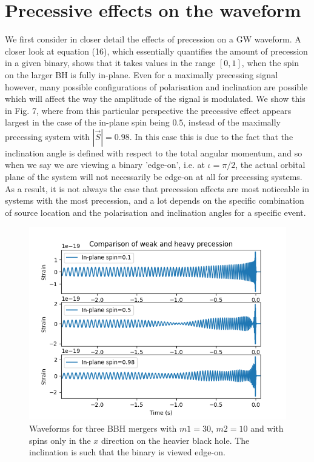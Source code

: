 \documentclass[]{article}
\begin{document}
\section{Precessive effects on the waveform}
We first consider in closer detail the effects of precession on a GW waveform. A closer look at equation (16), which essentially quantifies the amount of precession in a given binary, shows that it takes values in the range $[0,1]$, when the spin on the larger BH is fully in-plane. Even for a maximally precessing signal however, many possible configurations of polarisation and inclination are possible which will affect the way the amplitude of the signal is modulated. We show this in Fig. 7, where from this particular perspective the precessive effect appears largest in the case of the in-plane spin being $0.5$, instead of the maximally precessing system with $|\vec{S}|=0.98$. In this case this is due to the fact that the inclination angle is defined with respect to the total angular momentum, and so when we say we are viewing a binary 'edge-on', i.e. at $\iota=\pi/2$, the actual orbital plane of the system will not necessarily be edge-on at all for precessing systems. As a result, it is not always the case that precession affects are most noticeable in systems with the most precession, and a lot depends on the specific combination of source location and the polarisation and inclination angles for a specific event.
\begin{figure}[h]
	\includegraphics[scale=1]{fig8.png}
	\centering
	\caption{Waveforms for three BBH mergers with $m1=30$, $m2=10$ and with spins only in the $x$ direction on the heavier black hole. The inclination is such that the binary is viewed edge-on.}
	\centering
\end{figure}
\end{document}

